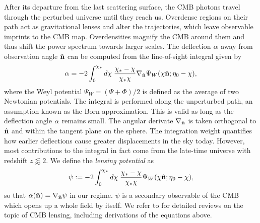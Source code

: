 After its departure from the last scattering surface, the CMB photons travel through the perturbed universe until they reach us. Overdense regions on their path act as gravitational lenses and alter the trajectories, which leave observable imprints to the CMB map. Overdensities magnify the CMB around them and thus shift the power spectrum towards larger scales. The deflection $\mathbf{\alpha}$ away from observation angle $\hat{\mathbf{n}}$ can be computed from the line-of-sight integral given by 
\begin{align}
	\mathbf{\alpha} = - 2\int_0^{\chi_*} d\chi \; \frac{\chi_* - \chi}{\chi_* \chi} \nabla_{\hat{\mathbf{n}}} \Psi_W (\chi\hat{\mathbf{n}}; \eta_0-\chi), 
\end{align}
where the Weyl potential $\Psi_W = (\Psi + \Phi)/2$ is defined as the average of two Newtonian potentials. The integral is performed along the unperturbed path, an assumption known as the Born approximation. This is valid as long as the deflection angle $\mathbf{\alpha}$ remains small. The angular derivate $\nabla_{\hat{\mathbf{n}}}$ is taken orthogonal to $\hat{\mathbf{n}}$ and within the tangent plane on the sphere. The integration weight quantifies how earlier deflections cause greater displacements in the sky today. However, most contributions to the integral in fact come from the late-time universe with redshift $z\lessapprox2$. We define the \textit{lensing potential} as
\begin{align}
	\psi := - 2\int_0^{\chi_*} d\chi \; \frac{\chi_* - \chi}{\chi_* \chi}  \Psi_W (\chi\hat{\mathbf{n}}; \eta_0-\chi), \label{def:lensing_potential}
\end{align}
so that $\mathbf{\alpha}(\hat{\mathbf{n}}) = \nabla_{\hat{\mathbf{n}}} \psi$ in our regime. $\psi$ is a secondary observable of the CMB which opens up a whole field by itself. We refer to \cite{Bartelmann2001weaklensing,Lewis2006weaklensing,Hanson2010weaklensing} for detailed reviews on the topic of CMB lensing, including derivations of the equations above.

